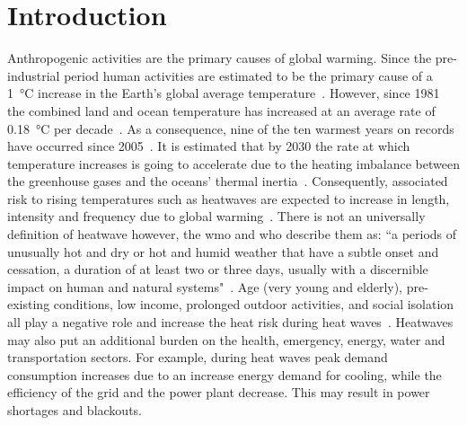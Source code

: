 

%

\section{Introduction}\label{sec:introduction}

Anthropogenic activities are the primary causes of global warming.
Since the pre-industrial period human activities are estimated to be the primary cause of a 1~°C increase in the Earth's global average temperature~\cite{GlobalWa91:online}.
However, since 1981 the combined land and ocean temperature has increased at an average rate of 0.18~°C per decade~\cite{GlobalCl28:online}.
As a consequence, nine of the ten warmest years on records have occurred since 2005~\cite{ClimateC26:online}.
It is estimated that by 2030 the rate at which temperature increases is going to accelerate due to the heating imbalance between the greenhouse gases and the oceans' thermal inertia~\cite{ClimateC26:online}.
Consequently, associated risk to rising temperatures such as heatwaves are expected to increase in length, intensity and frequency due to global warming~\cite{Whatharm75:online}.
There is not an universally definition of heatwave however, the \ac{wmo} and \ac{who} describe them as: ``a periods of unusually hot and dry or hot and humid weather that have a subtle onset and cessation, a duration of at least two or three days, usually with a discernible impact on human and natural systems"~\cite{WMO2015}.
Age (very young and elderly), pre-existing conditions, low income, prolonged outdoor activities, and social isolation all play a negative role and increase the heat risk during heat waves~\cite{WMO2015}.
Heatwaves may also put an additional burden on the health, emergency, energy, water and transportation sectors.
For example, during heat waves peak demand consumption increases due to an increase energy demand for cooling, while the efficiency of the grid and the power plant decrease.
This may result in power shortages and blackouts.

